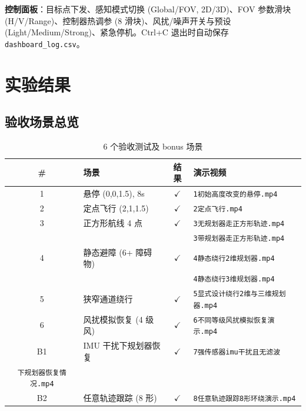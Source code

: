 \documentclass[12pt,a4paper]{article}
\begin{document}
\textbf{控制面板}：目标点下发、感知模式切换 (Global/FOV, 2D/3D)、FOV 参数滑块 (H/V/Range)、控制器热调参 (8 滑块)、风扰/噪声开关与预设 (Light/Medium/Strong)、紧急停机。Ctrl+C 退出时自动保存 \texttt{dashboard\_log.csv}。


\section{实验结果}

\subsection{验收场景总览}

\begin{table}[H]
\centering
\caption{6 个验收测试及 bonus 场景}
\label{tab:scenarios}
\footnotesize
\begin{tabularx}{\textwidth}{c l c p{3.8cm}}
\toprule
\textbf{\#} & \textbf{场景} & \textbf{结果} & \textbf{演示视频} \\
\midrule
1 & 悬停 (0,0,1.5), 8s        & $\checkmark$ & \texttt{1初始高度改变的悬停.mp4} \\
2 & 定点飞行 (2,1,1.5)         & $\checkmark$ & \texttt{2定点飞行.mp4} \\
3 & 正方形航线 4 点            & $\checkmark$ & \texttt{3无规划器走正方形轨迹.mp4} \\
  &                            &              & \texttt{3带规划器走正方形轨迹.mp4} \\
4 & 静态避障 (6+ 障碍物)       & $\checkmark$ & \texttt{4静态绕行2维规划器.mp4} \\
  &                            &              & \texttt{4静态绕行3维规划器.mp4} \\
5 & 狭窄通道绕行               & $\checkmark$ & \texttt{5显式设计绕行2维与三维规划器.mp4} \\
6 & 风扰模拟恢复 (4 级风)      & $\checkmark$ & \texttt{6不同等级风扰模拟恢复演示.mp4} \\
\addlinespace
B1 & IMU 干扰下规划器恢复       & $\checkmark$ & \texttt{7强传感器imu干扰且无滤波}\\ \texttt{下规划器恢复情况.mp4} \\
B2 & 任意轨迹跟踪 (8 形)        & $\checkmark$ & \texttt{8任意轨迹跟踪8形环绕演示.mp4} \\
\bottomrule
\end{tabularx}
\end{table}
\end{document}
